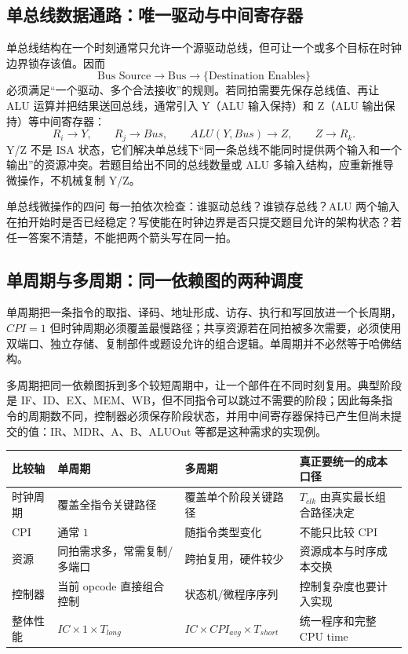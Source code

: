 \documentclass[UTF8,fontset=fandol,11pt,a4paper]{ctexart}
\begin{document}
\subsection{单总线数据通路：唯一驱动与中间寄存器}

单总线结构在一个时刻通常只允许一个源驱动总线，但可让一个或多个目标在时钟边界锁存该值。因而
\[
\text{Bus Source}\to\text{Bus}\to\{\text{Destination Enables}\}
\]
必须满足“一个驱动、多个合法接收”的规则。若同拍需要先保存总线值、再让 ALU 运算并把结果送回总线，通常引入 Y（ALU 输入保持）和 Z（ALU 输出保持）等中间寄存器：
\[
R_i\to Y,\qquad
R_j\to Bus,\qquad
ALU(Y,Bus)\to Z,\qquad
Z\to R_k.
\]
Y/Z 不是 ISA 状态，它们解决单总线下“同一条总线不能同时提供两个输入和一个输出”的资源冲突。若题目给出不同的总线数量或 ALU 多输入结构，应重新推导微操作，不机械复制 Y/Z。

\begin{methodbox}{单总线微操作的四问}
每一拍依次检查：谁驱动总线？谁锁存总线？ALU 两个输入在拍开始时是否已经稳定？写使能在时钟边界是否只提交题目允许的架构状态？若任一答案不清楚，不能把两个箭头写在同一拍。
\end{methodbox}

\subsection{单周期与多周期：同一依赖图的两种调度}

单周期把一条指令的取指、译码、地址形成、访存、执行和写回放进一个长周期，$CPI=1$ 但时钟周期必须覆盖最慢路径；共享资源若在同拍被多次需要，必须使用双端口、独立存储、复制部件或题设允许的组合逻辑。单周期并不必然等于哈佛结构。

多周期把同一依赖图拆到多个较短周期中，让一个部件在不同时刻复用。典型阶段是 IF、ID、EX、MEM、WB，但不同指令可以跳过不需要的阶段；因此每条指令的周期数不同，控制器必须保存阶段状态，并用中间寄存器保持已产生但尚未提交的值：IR、MDR、A、B、ALUOut 等都是这种需求的实现例。

\begin{center}\small
\begin{tabularx}{\linewidth}{L{2.1cm}L{3.0cm}L{3.2cm}Y}
\toprule
比较轴 & 单周期 & 多周期 & 真正要统一的成本口径 \\
\midrule
时钟周期 & 覆盖全指令关键路径 & 覆盖单个阶段关键路径 & $T_{clk}$ 由真实最长组合路径决定 \\
CPI & 通常 $1$ & 随指令类型变化 & 不能只比较 CPI \\
资源 & 同拍需求多，常需复制/多端口 & 跨拍复用，硬件较少 & 资源成本与时序成本交换 \\
控制器 & 当前 opcode 直接组合控制 & 状态机/微程序序列 & 控制复杂度也要计入实现 \\
整体性能 & $IC\times1\times T_{long}$ & $IC\times CPI_{avg}\times T_{short}$ & 统一程序和完整 CPU time \\
\bottomrule
\end{tabularx}
\end{center}
\end{document}
